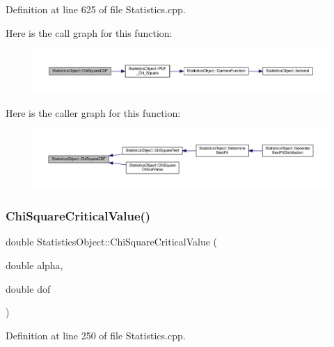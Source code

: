 Definition at line 625 of file Statistics.\+cpp.

Here is the call graph for this function\+:\nopagebreak
\begin{figure}[H]
\begin{center}
\leavevmode
\includegraphics[width=350pt]{class_statistics_object_a7ad5fc88ce637ed421f4fccf92a8b5e0_cgraph}
\end{center}
\end{figure}
Here is the caller graph for this function\+:\nopagebreak
\begin{figure}[H]
\begin{center}
\leavevmode
\includegraphics[width=350pt]{class_statistics_object_a7ad5fc88ce637ed421f4fccf92a8b5e0_icgraph}
\end{center}
\end{figure}
\mbox{\label{class_statistics_object_aa4d91e7d45164eb8a3849c1c7df585e1}} 
\subsubsection{\texorpdfstring{Chi\+Square\+Critical\+Value()}{ChiSquareCriticalValue()}}
{\footnotesize\ttfamily double Statistics\+Object\+::\+Chi\+Square\+Critical\+Value (\begin{DoxyParamCaption}\item[{double}]{alpha,  }\item[{double}]{dof }\end{DoxyParamCaption})}



Definition at line 250 of file Statistics.\+cpp.

